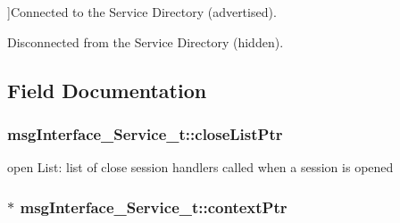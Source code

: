 \begin{Desc}
\begin{description}
{}]Connected to the Service Directory (advertised). \item[{\em 
L\+E\+\_\+\+M\+S\+G\+\_\+\+I\+N\+T\+E\+R\+F\+A\+C\+E\+\_\+\+S\+E\+R\+V\+I\+C\+E\+\_\+\+H\+I\+D\+D\+EN\hypertarget{structmsg_interface___service__t_a81f0570708fc39caf16b806f3ad32e21a486692d12634da37cfd95b56626bfe17}{}\label{structmsg_interface___service__t_a81f0570708fc39caf16b806f3ad32e21a486692d12634da37cfd95b56626bfe17}
}]Disconnected from the Service Directory (hidden). \end{description}
\end{Desc}


\subsection{Field Documentation}
\subsubsection[{\texorpdfstring{close\+List\+Ptr}{closeListPtr}}]{ msg\+Interface\+\_\+\+Service\+\_\+t\+::close\+List\+Ptr}\hypertarget{structmsg_interface___service__t_adb16893a8279a37a024a9b74d5263977}{}\label{structmsg_interface___service__t_adb16893a8279a37a024a9b74d5263977}
open List\+: list of close session handlers called when a session is opened 
\subsubsection[{\texorpdfstring{context\+Ptr}{contextPtr}}]{$\ast$ msg\+Interface\+\_\+\+Service\+\_\+t\+::context\+Ptr}\hypertarget{structmsg_interface___service__t_a0fc576ecc663bb71bfd54b22fdeb32c6}{}\label{structmsg_interface___service__t_a0fc576ecc663bb71bfd54b22fdeb32c6}


